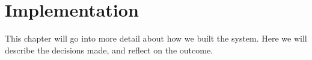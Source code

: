 \chapter{Implementation}\label{cha:implementation}

This chapter will go into more detail about how we built the system. Here we will describe the decisions made, and reflect on the outcome.




